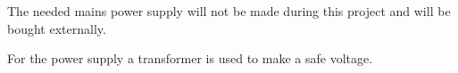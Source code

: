 The needed mains power supply will not be made during this project and will be bought externally.

\noindent For the power supply a transformer is used to make a safe voltage.